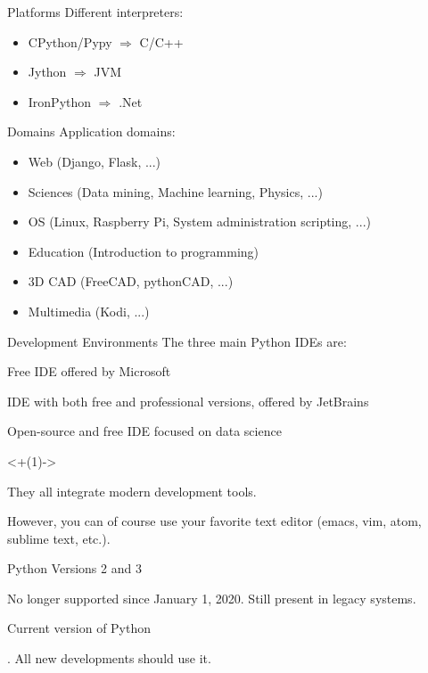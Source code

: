 \begin{frame}{Platforms}
  Different interpreters:
  \begin{itemize}
  \item CPython/Pypy $\Rightarrow$ C/C++
  \item Jython $\Rightarrow$ JVM
  \item IronPython $\Rightarrow$ .Net
  \end{itemize}
\end{frame}

\begin{frame}{Domains}
  Application domains:
  \begin{itemize}
  \item Web (Django, Flask, ...)
  \item Sciences (Data mining, Machine learning, Physics, ...)
  \item OS (Linux, Raspberry Pi, System administration scripting, ...)
  \item Education (Introduction to programming)
  \item 3D CAD (FreeCAD, pythonCAD, ...)
  \item Multimedia (Kodi, ...)
  \end{itemize}
\end{frame}

\begin{frame}{Development Environments}
  The three main Python IDEs are:

  \begin{description}[<+(1)->]
    \item[Visual Studio Code] Free IDE offered by Microsoft
    \item[PyCharm] IDE with both free and professional versions, offered by JetBrains
    \item[Spyder] Open-source and free IDE focused on data science
  \end{description}

  \onslide<+(1)->{
    They all integrate modern development tools.

    However, you can of course use your favorite text editor (emacs, vim, atom, sublime text, etc.).
  }
\end{frame}

\begin{frame}{Python Versions 2 and 3}
  \begin{description}[<+->]
    \item[Version 2] No longer supported since January 1, 2020. Still present in legacy systems.
    \item[Version 3] Current version of Python

. All new developments should use it.
  \end{description}
\end{frame}

